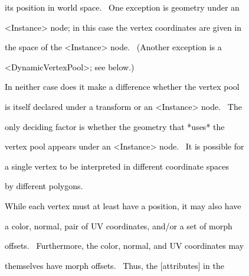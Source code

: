 \documentclass[a4paper]{article}
\newcommand\textstyleOOoComputerKeyWord[1]{\textrm{\textcolor[rgb]{0.0,0.0,0.5019608}{#1}}}
\begin{document}
{\color{black}
\textstyleOOoComputerKeyWord{\textcolor{black}{\ \ \ \ its position in world space. \ One exception is geometry under
an}}}

{\color{black}
\textstyleOOoComputerKeyWord{\textcolor{black}{\ \ \ \ {\textless}Instance{\textgreater} node; in this case the vertex
coordinates are given in}}}

{\color{black}
\textstyleOOoComputerKeyWord{\textcolor{black}{\ \ \ \ the space of the {\textless}Instance{\textgreater} node.
\ (Another exception is a}}}

{\color{black}
\textstyleOOoComputerKeyWord{\textcolor{black}{\ \ \ \ {\textless}DynamicVertexPool{\textgreater}; see below.)}}}


\bigskip

{\color{black}
\textstyleOOoComputerKeyWord{\textcolor{black}{\ \ \ \ In neither case does it make a difference whether the vertex
pool}}}

{\color{black}
\textstyleOOoComputerKeyWord{\textcolor{black}{\ \ \ \ is itself declared under a transform or an
{\textless}Instance{\textgreater} node. \ The}}}

{\color{black}
\textstyleOOoComputerKeyWord{\textcolor{black}{\ \ \ \ only deciding factor is whether the geometry that *uses* the}}}

{\color{black}
\textstyleOOoComputerKeyWord{\textcolor{black}{\ \ \ \ vertex pool appears under an {\textless}Instance{\textgreater}
node. \ It is possible for}}}

{\color{black}
\textstyleOOoComputerKeyWord{\textcolor{black}{\ \ \ \ a single vertex to be interpreted in different coordinate
spaces}}}

{\color{black}
\textstyleOOoComputerKeyWord{\textcolor{black}{\ \ \ \ by different polygons.}}}


\bigskip

{\color{black}
\textstyleOOoComputerKeyWord{\textcolor{black}{\ \ \ \ While each vertex must at least have a position, it may also
have}}}

{\color{black}
\textstyleOOoComputerKeyWord{\textcolor{black}{\ \ \ \ a color, normal, pair of UV coordinates, and/or a set of morph}}}

{\color{black}
\textstyleOOoComputerKeyWord{\textcolor{black}{\ \ \ \ offsets. \ Furthermore, the color, normal, and UV coordinates
may}}}

{\color{black}
\textstyleOOoComputerKeyWord{\textcolor{black}{\ \ \ \ themselves have morph offsets. \ Thus, the [attributes] in the}}}
\end{document}

